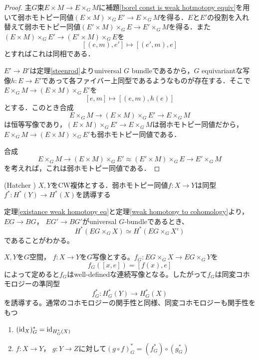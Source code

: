 \begin{proof}
  主$G$束$E\times M\rightarrow E\times_GM$に補題\ref{borel const is weak hotmotopy equiv}を用いて弱ホモトピー同値$(E\times M)\times_GE'\rightarrow E\times_GM$を得る．$E$と$E'$の役割を入れ替えて弱ホモトピー同値$(E'\times M)\times_GE\rightarrow E'\times_GM$を得る．また$(E\times M)\times_GE'\rightarrow (E'\times M)\times_GE$を
  \[
  [(e,m),e']\mapsto [(e',m),e]
  \]
  とすればこれは同相である．

  $E'\rightarrow B'$は定理\ref{steenrod}よりuniversal $G$ bundleであるから，$G$ equivariantな写像$h\colon E\rightarrow E'$であって各ファイバー上同型であるようなものが存在する．そこで$E\times_GM\rightarrow (E\times M)\times_GE'$を
  \[
  [e,m]\mapsto [(e,m),h(e)]
  \]
  とする．このとき合成
  \[
  E\times_GM\rightarrow (E\times M)\times_GE'\rightarrow E\times_GM
  \]
  は恒等写像であり，$(E\times M)\times_GE'\rightarrow E\times_GM$は弱ホモトピー同値だから，$E\times_GM\rightarrow (E\times M)\times_GE'$も弱ホモトピー同値である．
  
  合成
  \[
  E\times_GM\rightarrow (E\times M)\times_GE'\approx (E'\times M)\times_GE\rightarrow E'\times_GM
  \]
  を考えれば，これは弱ホモトピー同値である．
\end{proof}

\begin{theo}(Hatcher \cite{hatcher Top})\label{weak homotopy to cohomology}
  $X,Y$をCW複体とする．弱ホモトピー同値$f\colon X\rightarrow Y$は同型$f^*\colon H^*(Y)\rightarrow H^*(X)$を誘導する
\end{theo}

定理\ref{existance weak homotopy eq}と定理\ref{weak homotopy to cohomology}より， $EG\rightarrow BG$， $EG'\rightarrow BG'$がuniversal $G$-bundleであるとき、
\[
H^*(EG\times_GX)\simeq H^*(EG\times_GX')
\]
であることがわかる。

$X, Y$を$G$空間， $f\colon X\rightarrow Y$を$G$写像とする。$f_G\colon EG\times_GX\rightarrow EG\times_GY$を
\[
f_G([x, e])=[f(x), e]
\]
によって定めると$f_G$はwell-definedな連続写像となる。したがって$f_G$は同変コホモロジーの準同型
\[
f_G^*\colon H^*_G(Y)\rightarrow H^*_G(X)
\]
を誘導する。通常のコホモロジーの関手性と同様、同変コホモロジーも関手性をもつ
\begin{prop}\:
  \begin{enumerate}
    \item $(\text{id}_{X})_G^*=\text{id}_{H^*_G(X)}$
    \item $f\colon X\rightarrow Y$， $g\colon Y\rightarrow Z$に対して$(g\circ f)_G^*=(f_G^*)\circ(g_G^*)$
  \end{enumerate}
\end{prop}

